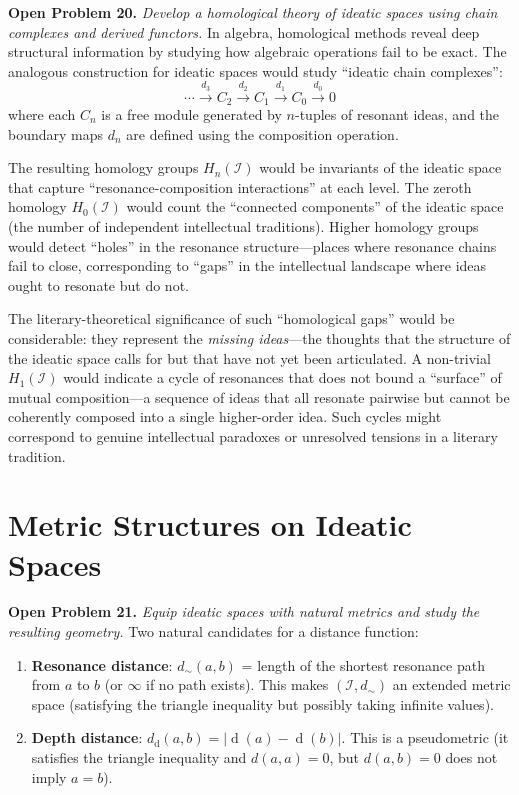 \documentclass[11pt,openany]{book}
\theoremstyle{definition}
\theoremstyle{plain}
\theoremstyle{remark}
\newcommand{\IS}{\mathcal{I}}               %
\newcommand{\res}{\sim}                      %
\newcommand{\depth}{\operatorname{d}}       %
\begin{document}
\textbf{Open Problem 20.} \emph{Develop a homological theory of ideatic spaces using chain complexes and derived functors.} In algebra, homological methods reveal deep structural information by studying how algebraic operations fail to be exact. The analogous construction for ideatic spaces would study ``ideatic chain complexes'':
\[
\cdots \xrightarrow{d_3} C_2 \xrightarrow{d_2} C_1 \xrightarrow{d_1} C_0 \xrightarrow{d_0} 0
\]
where each $C_n$ is a free module generated by $n$-tuples of resonant ideas, and the boundary maps $d_n$ are defined using the composition operation.

The resulting homology groups $H_n(\IS)$ would be invariants of the ideatic space that capture ``resonance-composition interactions'' at each level. The zeroth homology $H_0(\IS)$ would count the ``connected components'' of the ideatic space (the number of independent intellectual traditions). Higher homology groups would detect ``holes'' in the resonance structure---places where resonance chains fail to close, corresponding to ``gaps'' in the intellectual landscape where ideas ought to resonate but do not.

The literary-theoretical significance of such ``homological gaps'' would be considerable: they represent the \emph{missing ideas}---the thoughts that the structure of the ideatic space calls for but that have not yet been articulated. A non-trivial $H_1(\IS)$ would indicate a cycle of resonances that does not bound a ``surface'' of mutual composition---a sequence of ideas that all resonate pairwise but cannot be coherently composed into a single higher-order idea. Such cycles might correspond to genuine intellectual paradoxes or unresolved tensions in a literary tradition.

\section{Metric Structures on Ideatic Spaces}

\textbf{Open Problem 21.} \emph{Equip ideatic spaces with natural metrics and study the resulting geometry.} Two natural candidates for a distance function:

\begin{enumerate}
\item \textbf{Resonance distance}: $d_{\res}(a, b)$ = length of the shortest resonance path from $a$ to $b$ (or $\infty$ if no path exists). This makes $(\IS, d_{\res})$ an extended metric space (satisfying the triangle inequality but possibly taking infinite values).
\item \textbf{Depth distance}: $d_{\depth}(a, b) = |\depth(a) - \depth(b)|$. This is a pseudometric (it satisfies the triangle inequality and $d(a, a) = 0$, but $d(a, b) = 0$ does not imply $a = b$).
\end{enumerate}
\end{document}
